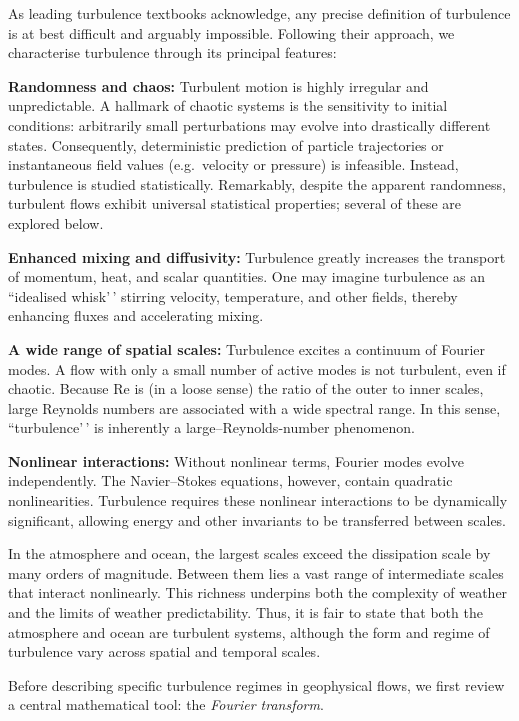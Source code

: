 \documentclass[
  letterpaper,
  twocolumn,
  landscape]{report}
\begin{document}
As leading turbulence textbooks acknowledge, any precise definition of
turbulence is at best difficult and arguably impossible. Following their
approach, we characterise turbulence through its principal features:

\textbf{Randomness and chaos:} Turbulent motion is highly irregular and
unpredictable. A hallmark of chaotic systems is the sensitivity to
initial conditions: arbitrarily small perturbations may evolve into
drastically different states. Consequently, deterministic prediction of
particle trajectories or instantaneous field values (e.g.~velocity or
pressure) is infeasible. Instead, turbulence is studied statistically.
Remarkably, despite the apparent randomness, turbulent flows exhibit
universal statistical properties; several of these are explored below.

\textbf{Enhanced mixing and diffusivity:} Turbulence greatly increases
the transport of momentum, heat, and scalar quantities. One may imagine
turbulence as an ``idealised whisk'\,' stirring velocity, temperature,
and other fields, thereby enhancing fluxes and accelerating mixing.

\textbf{A wide range of spatial scales:} Turbulence excites a continuum
of Fourier modes. A flow with only a small number of active modes is not
turbulent, even if chaotic. Because \(\mathrm{Re}\) is (in a loose
sense) the ratio of the outer to inner scales, large Reynolds numbers
are associated with a wide spectral range. In this sense,
``turbulence'\,' is inherently a large--Reynolds-number phenomenon.

\textbf{Nonlinear interactions:} Without nonlinear terms, Fourier modes
evolve independently. The Navier--Stokes equations, however, contain
quadratic nonlinearities. Turbulence requires these nonlinear
interactions to be dynamically significant, allowing energy and other
invariants to be transferred between scales.

In the atmosphere and ocean, the largest scales exceed the dissipation
scale by many orders of magnitude. Between them lies a vast range of
intermediate scales that interact nonlinearly. This richness underpins
both the complexity of weather and the limits of weather predictability.
Thus, it is fair to state that both the atmosphere and ocean are
turbulent systems, although the form and regime of turbulence vary
across spatial and temporal scales.

Before describing specific turbulence regimes in geophysical flows, we
first review a central mathematical tool: the \emph{Fourier transform}.
\end{document}
